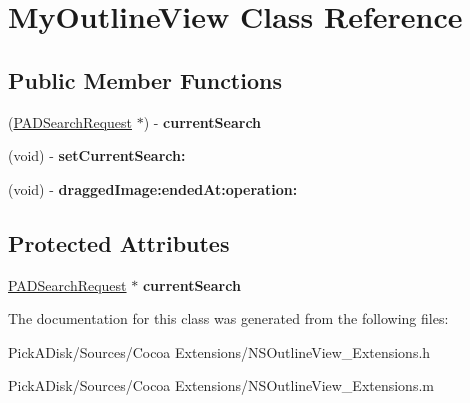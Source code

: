 \hypertarget{interface_my_outline_view}{
\section{MyOutlineView Class Reference}
\label{interface_my_outline_view}
}
\subsection*{Public Member Functions}
\begin{DoxyCompactItemize}
\item 
\hypertarget{interface_my_outline_view_a2c7149ad4d1d08840bd2c05fed2e928e}{
(\hyperlink{interface_p_a_d_search_request}{PADSearchRequest} $\ast$) -\/ {\bfseries currentSearch}}
\label{interface_my_outline_view_a2c7149ad4d1d08840bd2c05fed2e928e}

\item 
\hypertarget{interface_my_outline_view_ae7fdec82607bedeba919bef059e984d1}{
(void) -\/ {\bfseries setCurrentSearch:}}
\label{interface_my_outline_view_ae7fdec82607bedeba919bef059e984d1}

\item 
\hypertarget{interface_my_outline_view_a593b11799c65c342501bcd4ac21c523d}{
(void) -\/ {\bfseries draggedImage:endedAt:operation:}}
\label{interface_my_outline_view_a593b11799c65c342501bcd4ac21c523d}

\end{DoxyCompactItemize}
\subsection*{Protected Attributes}
\begin{DoxyCompactItemize}
\item 
\hypertarget{interface_my_outline_view_a80f82a6e75950a2c07effa429eed36a4}{
\hyperlink{interface_p_a_d_search_request}{PADSearchRequest} $\ast$ {\bfseries currentSearch}}
\label{interface_my_outline_view_a80f82a6e75950a2c07effa429eed36a4}

\end{DoxyCompactItemize}


The documentation for this class was generated from the following files:\begin{DoxyCompactItemize}
\item 
PickADisk/Sources/Cocoa Extensions/NSOutlineView\_\-Extensions.h\item 
PickADisk/Sources/Cocoa Extensions/NSOutlineView\_\-Extensions.m\end{DoxyCompactItemize}
